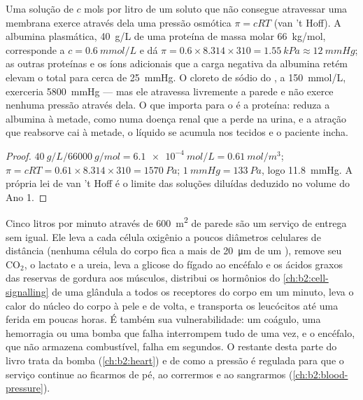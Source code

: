\begin{theorem}\label{thm:b2:blood-circulation:oncotic}
Uma solução de $c$ mols por litro de um soluto que não consegue
atravessar uma membrana exerce através dela uma pressão osmótica
$\pi = cRT$ (van 't Hoff). A albumina plasmática, \qty{40}{g/L} de uma
proteína de massa molar \qty{66}{kg/mol}, corresponde a
$c = \qty{0.6}{mmol/L}$ e dá $\pi =
0.6\times 8.314\times 310 = \qty{1.55}{kPa} \approx \qty{12}{mmHg}$;
as outras proteínas e os íons adicionais que a carga negativa da
albumina retém elevam o total para cerca de \qty{25}{mmHg}. O cloreto
de sódio do , a \qty{150}{mmol/L}, exerceria \qty{5800}{mmHg}
--- mas ele atravessa livremente a parede  e não exerce nenhuma
pressão através dela. O que importa para o  é a proteína: reduza
a albumina à metade, como numa doença renal que a perde na urina, e a
atração que reabsorve cai à metade, o líquido se acumula nos tecidos e
o paciente incha.
\end{theorem}
\begin{proof}
$\qty{40}{g/L}/\qty{66000}{g/mol} = \qty{6.1e-4}{mol/L} =
\qty{0.61}{mol/m^3}$; $\pi = cRT = 0.61\times 8.314\times 310 =
\qty{1570}{Pa}$; $\qty{1}{mmHg} = \qty{133}{Pa}$, logo
\qty{11.8}{mmHg}. A própria lei de van 't Hoff é o limite das soluções
diluídas deduzido no volume do Ano 1.
\end{proof}

\begin{example}\label{ex:b2:blood-circulation:transport}
Cinco litros por minuto através de \qty{600}{m^2} de parede  são
um serviço de entrega sem igual. Ele leva a cada célula oxigênio a
poucos diâmetros celulares de distância (nenhuma célula do corpo fica a
mais de \qty{20}{\micro m} de um ), remove seu $\mathrm{CO_2}$,
o lactato e a ureia, leva a glicose do fígado ao encéfalo e os ácidos
graxos das reservas de gordura aos músculos, distribui os hormônios do
\cref{ch:b2:cell-signalling} de uma glândula a todos os receptores do corpo em um minuto,
leva o calor do núcleo do corpo à pele e de volta, e transporta os
leucócitos até uma ferida em poucas horas. É também sua
vulnerabilidade: um coágulo, uma hemorragia ou uma bomba que falha
interrompem tudo de uma vez, e o encéfalo, que não armazena combustível,
falha em segundos. O restante desta parte do livro trata da bomba
(\cref{ch:b2:heart}) e de como a pressão é regulada para que o serviço continue
ao ficarmos de pé, ao corrermos e ao sangrarmos (\cref{ch:b2:blood-pressure}).
\end{example}

